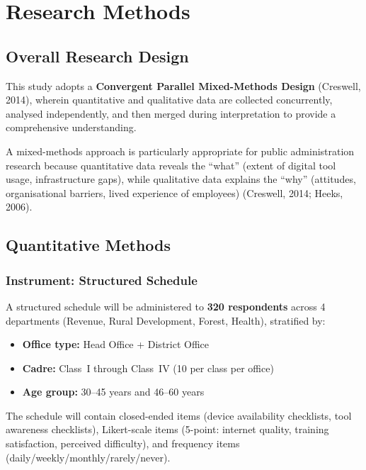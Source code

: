 \documentclass[12pt,a4paper]{article}
\begin{document}
\newpage

\section{Research Methods}

\subsection{Overall Research Design}

This study adopts a \textbf{Convergent Parallel Mixed-Methods Design} (Creswell, 2014), wherein quantitative and qualitative data are collected concurrently, analysed independently, and then merged during interpretation to provide a comprehensive understanding.

A mixed-methods approach is particularly appropriate for public administration research because quantitative data reveals the ``what'' (extent of digital tool usage, infrastructure gaps), while qualitative data explains the ``why'' (attitudes, organisational barriers, lived experience of employees) (Creswell, 2014; Heeks, 2006).

\subsection{Quantitative Methods}

\subsubsection{Instrument: Structured Schedule}

A structured schedule will be administered to \textbf{320 respondents} across 4 departments (Revenue, Rural Development, Forest, Health), stratified by:

\begin{itemize}[leftmargin=1.5em, itemsep=2pt]
    \item \textbf{Office type:} Head Office + District Office
    \item \textbf{Cadre:} Class~I through Class~IV (10 per class per office)
    \item \textbf{Age group:} 30--45 years and 46--60 years
\end{itemize}

The schedule will contain closed-ended items (device availability checklists, tool awareness checklists), Likert-scale items (5-point: internet quality, training satisfaction, perceived difficulty), and frequency items (daily/weekly/monthly/rarely/never).
\end{document}
